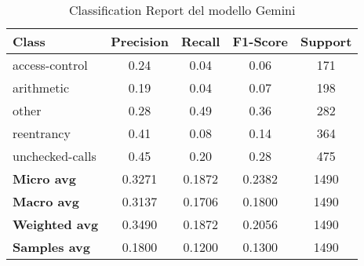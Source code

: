 \documentclass[../../Thesis.tex]{subfiles}
\begin{document}
\begin{table}[H]
    \centering
    \small
    \begin{tabular}{lcccc}
    \hline
    \textbf{Class} & \textbf{Precision} & \textbf{Recall} & \textbf{F1-Score} & \textbf{Support} \\
    \hline
    access-control & 0.24 & 0.04 & 0.06 & 171 \\
    arithmetic & 0.19 & 0.04 & 0.07 & 198 \\
    other & 0.28 & 0.49 & 0.36 & 282 \\
    reentrancy & 0.41 & 0.08 & 0.14 & 364 \\
    unchecked-calls & 0.45 & 0.20 & 0.28 & 475 \\
    \hline
    \textbf{Micro avg} & 0.3271 & 0.1872 & 0.2382 & 1490 \\
    \textbf{Macro avg} & 0.3137 & 0.1706 & 0.1800 & 1490 \\
    \textbf{Weighted avg} & 0.3490 & 0.1872 & 0.2056 & 1490 \\
    \textbf{Samples avg} & 0.1800 & 0.1200 & 0.1300 & 1490 \\
    \hline
    \end{tabular}
    \caption{Classification Report del modello Gemini}
    \end{table}
    
\end{document}
